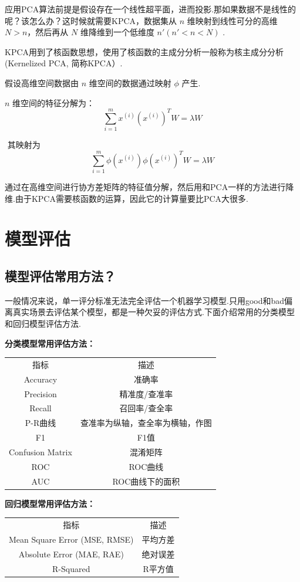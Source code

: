 ​
应用PCA算法前提是假设存在一个线性超平面，进而投影.那如果数据不是线性的呢？该怎么办？这时候就需要KPCA，数据集从
$n$ 维映射到线性可分的高维 $N >n$，然后再从 $N$ 维降维到一个低维度
$n'(n'<n<N)$ .

​
KPCA用到了核函数思想，使用了核函数的主成分分析一般称为核主成分分析(Kernelized
PCA, 简称KPCA）.

假设高维空间数据由 $n​$ 维空间的数据通过映射 $\phi​$ 产生.

​ $n$ 维空间的特征分解为： \[
\sum^m_{i=1} x^{(i)} \left( x^{(i)} \right)^T W = \lambda W
\]

​ 其映射为 \[
\sum^m_{i=1} \phi \left( x^{(i)} \right) \phi \left( x^{(i)} \right)^T W = \lambda W
\]

​
通过在高维空间进行协方差矩阵的特征值分解，然后用和PCA一样的方法进行降维.由于KPCA需要核函数的运算，因此它的计算量要比PCA大很多.

\section{ 模型评估}\label{ux6a21ux578bux8bc4ux4f30}

\subsection{模型评估常用方法？}\label{ux6a21ux578bux8bc4ux4f30ux5e38ux7528ux65b9ux6cd5}

​
一般情况来说，单一评分标准无法完全评估一个机器学习模型.只用good和bad偏离真实场景去评估某个模型，都是一种欠妥的评估方式.下面介绍常用的分类模型和回归模型评估方法.

\textbf{分类模型常用评估方法：}

\begin{longtable}[]{cc}
指标 & 描述\tabularnewline
Accuracy & 准确率\tabularnewline
Precision & 精准度/查准率\tabularnewline
Recall & 召回率/查全率\tabularnewline
P-R曲线 & 查准率为纵轴，查全率为横轴，作图\tabularnewline
F1 & F1值\tabularnewline
Confusion Matrix & 混淆矩阵\tabularnewline
ROC & ROC曲线\tabularnewline
AUC & ROC曲线下的面积\tabularnewline
\end{longtable}

\textbf{回归模型常用评估方法：}

\begin{longtable}[]{cc}
指标 & 描述\tabularnewline
Mean Square Error (MSE, RMSE) & 平均方差\tabularnewline
Absolute Error (MAE, RAE) & 绝对误差\tabularnewline
R-Squared & R平方值\tabularnewline
\end{longtable}

